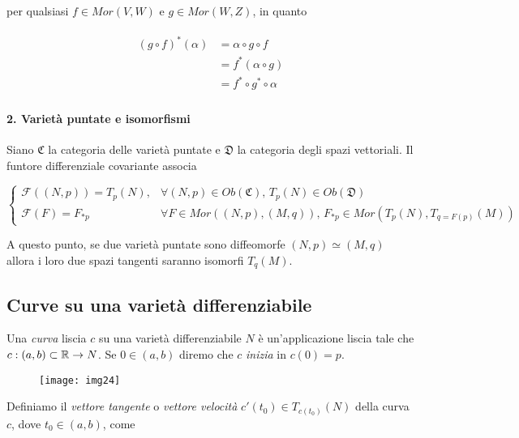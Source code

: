 per qualsiasi $ f \in Mor(V,W) $ e $ g \in Mor(W,Z) $, in quanto

\begin{align}
	\begin{split}
		(g \circ f)^{*}(\alpha) &= \alpha \circ g \circ f\\
		&= f^{*} (\alpha \circ g)\\
		&= f^{*} \circ g^{*} \circ \alpha
	\end{split}
\end{align}

\paragraph{2. Varietà puntate e isomorfismi}

Siano $ \mathfrak{C} $ la categoria delle varietà puntate e $ \mathfrak{D} $ la categoria degli spazi vettoriali. Il funtore differenziale covariante associa

\begin{equation}
	\begin{cases}
		\mathcal{F}((N,p)) = T_{p}(N), & \forall (N,p) \in Ob(\mathfrak{C}), \, T_{p}(N) \in Ob(\mathfrak{D})\\
		\mathcal{F}(F) = F_{*p} & \forall F \in Mor((N,p),(M,q)), \, F_{*p} \in Mor(T_{p}(N),T_{q=F(p)}(M))
	\end{cases}
\end{equation}

A questo punto, se due varietà puntate sono diffeomorfe $ (N,p) \simeq (M,q) $ allora i loro due spazi tangenti saranno isomorfi $ T_{q}(M) $.

\subsection{Curve su una varietà differenziabile}

Una \textit{curva} liscia $ c $ su una varietà differenziabile $ N $ è un'applicazione liscia tale che $ c : (a,b) \subset \mathbb{R} \to N $. Se $ 0 \in (a,b) $ diremo che $ c $ \textit{inizia} in $ c(0)=p $.

\begin{figure}[H]
	\centering
	\texttt{[image: img24]}
\end{figure}

Definiamo il \textit{vettore tangente} o \textit{vettore velocità} $ c'(t_{0}) \in T_{c(t_{0})}(N) $ della curva $ c $, dove $ t_{0} \in (a,b) $, come

